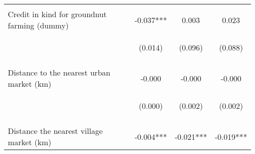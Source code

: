 \begin{center}
\begin{tabular}{lccc}
\vspace{4pt} & \begin{footnotesize}[0.492]\end{footnotesize} & \begin{footnotesize}[0.848]\end{footnotesize} & \begin{footnotesize}[0.737]\end{footnotesize} \\
Credit in kind for groundnut farming (dummy) & -0.037*** & 0.003 & 0.023 \\
 & \begin{footnotesize}(0.014)\end{footnotesize} & \begin{footnotesize}(0.096)\end{footnotesize} & \begin{footnotesize}(0.088)\end{footnotesize} \\
\vspace{4pt} & \begin{footnotesize}[0.008]\end{footnotesize} & \begin{footnotesize}[0.974]\end{footnotesize} & \begin{footnotesize}[0.797]\end{footnotesize} \\
Distance to the nearest urban market (km) & -0.000 & -0.000 & -0.000 \\
 & \begin{footnotesize}(0.000)\end{footnotesize} & \begin{footnotesize}(0.002)\end{footnotesize} & \begin{footnotesize}(0.002)\end{footnotesize} \\
\vspace{4pt} & \begin{footnotesize}[0.135]\end{footnotesize} & \begin{footnotesize}[0.807]\end{footnotesize} & \begin{footnotesize}[0.895]\end{footnotesize} \\
Distance the nearest village market (km) & -0.004*** & -0.021*** & -0.019*** \\

\end{tabular}
\end{center}
